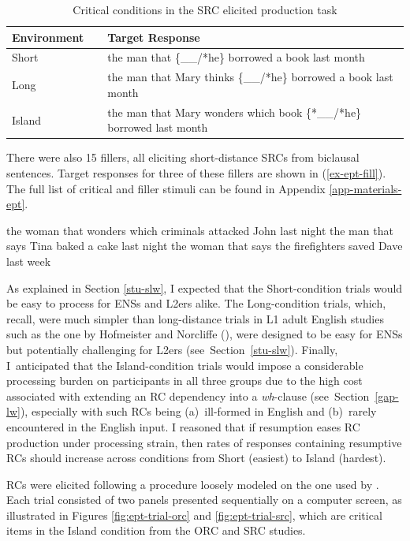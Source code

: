 \begin{table}
\caption{Critical conditions in the SRC elicited production task}\label{tab:ept-cond-src}
\raggedright{}
\begin{tabularx}{\linewidth}{lX}\toprule
Environment~~ & Target Response \\\midrule
Short & the man that \{\_\_/*he\} borrowed a book last month \\
Long & the man that Mary thinks \{\_\_/*he\} borrowed a book last month \\
Island & the man that Mary wonders which book \{*\_\_/*he\} borrowed last month \\\bottomrule
\end{tabularx}
\vspace{-12pt}
\end{table}

\noindent There were also 15 fillers, all eliciting short-distance SRCs from biclausal sentences. Target responses for three of these fillers are shown in (\ref{ex-ept-fill}). The full list of critical and filler stimuli can be found in Appendix \ref{app-materials-ept}.

\pex\label{ex-ept-fill}
\a the woman that wonders which criminals attacked John last night
\a the man that says Tina baked a cake last night
\a the woman that says the firefighters saved Dave last week
\xe 

As explained in Section \ref{stu-slw}, I expected that the Short-condition trials would be easy to process for ENSs and L2ers alike. The Long-condition trials, which, recall, were much simpler than long-distance trials in L1 adult English studies such as the one by Hofmeister and Norcliffe (\citeyear{hofmeister.norcliffe2013}), were designed to be easy for ENSs but potentially challenging for L2ers (see~Section~\ref{stu-slw}). Finally, I~anticipated that the Island-condition trials would impose a considerable processing burden on participants in all three groups due to the high cost associated with extending an RC dependency into a \textit{wh}-clause (see~Section~\ref{gap-lw}), especially with such RCs being (a)~ill-formed in English and (b)~rarely encountered in the English input. I reasoned that if resumption eases RC production under processing strain, then rates of responses containing resumptive RCs should increase across conditions from Short (easiest) to Island (hardest).

RCs were elicited following a procedure loosely modeled on the one used by \textcite{ferreira.swets2005}. Each trial consisted of two panels presented sequentially on a computer screen, as illustrated in Figures \ref{fig:ept-trial-orc} and \ref{fig:ept-trial-src}, which are critical items in the Island condition from the ORC and SRC studies.

